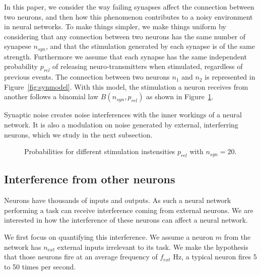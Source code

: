 \documentclass[journal]{IEEEtran}
\begin{document}
In this paper, we consider the way failing synapses affect the connection between two neurons, and then how this phenomenon contributes to a noisy environment in neural networks. To make things simpler, we make things uniform by considering that any connection between two neurons has the same number of synapese $n_{syn}$, and that the stimulation generated by each synapse is of the same strength. Furthermore we assume that each synapse has the same independent probability $p_{rel}$ of releasing neuro-transmitters when stimulated, regardless of previous events. The connection between two neurons $n_1$ and $n_2$ is represented in Figure~\ref{fig:synmodel}. With this model, the stimulation a neuron receives from another follows a binomial law $B(n_{syn}, p_{rel})$ as shown in Figure~\ref{fig:binomial}.

Synaptic noise creates noise interferences with the inner workings of a neural network. It is also a modulation on noise generated by external, interferring neurons, which we study in the next subsection. 

\begin{figure}
\caption{Probabilities for different stimulation instensities $p_{rel}$ with $n_{syn}=20$.}
\label{fig:binomial}
\end{figure}

\subsection{Interference from other neurons}

Neurons have thousands of inputs and outputs. As such a neural network performing a task can receive interference coming from external neurons. We are interested in how the interference of these neurons can affect a neural network.

We first focus on quantifying this interference. We assume a neuron $m$ from the network has $n_{ext}$ external inputs irrelevant to its task. We make the hypothesis that those neurons fire at an average frequency of $f_{ext}$ Hz, a typical neuron fires 5 to 50 times per second. 
\end{document}
